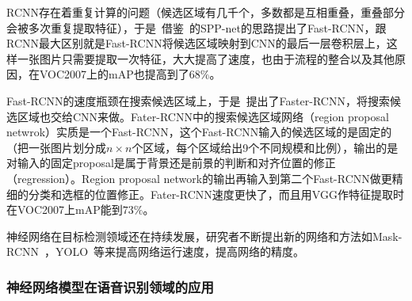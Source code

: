 
RCNN存在着重复计算的问题（候选区域有几千个，多数都是互相重叠，重叠部分会被多次重复提取特征），于是~\citet{girshick2015fast}借鉴~\citet{he2014spatial}的SPP-net的思路提出了Fast-RCNN，跟RCNN最大区别就是Fast-RCNN将候选区域映射到CNN的最后一层卷积层上，这样一张图片只需要提取一次特征，大大提高了速度，也由于流程的整合以及其他原因，在VOC2007上的mAP也提高到了$68\%$。

Fast-RCNN的速度瓶颈在搜索候选区域上，于是~\citet{ren2015faster}提出了Faster-RCNN，将搜索候选区域也交给CNN来做。Fater-RCNN中的搜索候选区域网络（region proposal netwrok）实质是一个Fast-RCNN，这个Fast-RCNN输入的候选区域的是固定的（把一张图片划分成$n\times n$个区域，每个区域给出9个不同规模和比例），输出的是对输入的固定proposal是属于背景还是前景的判断和对齐位置的修正（regression）。Region proposal network的输出再输入到第二个Fast-RCNN做更精细的分类和选框的位置修正。Fater-RCNN速度更快了，而且用VGG作特征提取时在VOC2007上mAP能到$73\%$。

神经网络在目标检测领域还在持续发展，研究者不断提出新的网络和方法如Mask-RCNN~\cite{he2017mask}，YOLO~\cite{redmon2016you}等来提高网络运行速度，提高网络的精度。

\subsubsection{神经网络模型在语音识别领域的应用}

    
